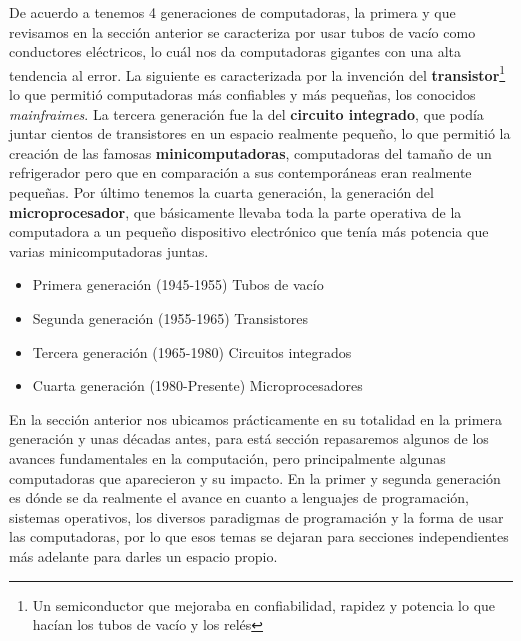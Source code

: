 \documentclass[letterpaper,12pt,oneside]{book}
\begin{document}
		De acuerdo a \cite{tanenbaum_modern_2002} tenemos 4 generaciones de computadoras, la primera y que revisamos en la sección anterior se caracteriza
		por usar tubos de vacío como conductores eléctricos, lo cuál nos da computadoras gigantes con una alta tendencia al error. La siguiente es caracterizada
		por la invención del \textbf{transistor}\footnote{Un semiconductor que mejoraba en confiabilidad, rapidez y potencia lo que hacían los tubos de vacío y los relés} lo que permitió computadoras más confiables y más pequeñas, los conocidos \textit{mainfraimes}. La
		tercera generación fue la del \textbf{circuito integrado}, que podía juntar cientos de transistores en un espacio realmente pequeño, lo que permitió
		la creación de las famosas \textbf{minicomputadoras}, computadoras del tamaño de un refrigerador pero que en comparación a sus contemporáneas eran realmente
		pequeñas. Por último tenemos la cuarta generación, la generación del \textbf{microprocesador}, que básicamente llevaba toda la parte operativa de la computadora
		a un pequeño dispositivo electrónico que tenía más potencia que varias minicomputadoras juntas.
		
		\begin{itemize}
			\item Primera generación (1945-1955) Tubos de vacío
			\item Segunda generación (1955-1965) Transistores
			\item Tercera generación (1965-1980) Circuitos integrados
			\item Cuarta generación (1980-Presente) Microprocesadores
		\end{itemize}
		
		En la sección anterior nos ubicamos prácticamente en su totalidad en la primera generación y unas décadas antes, para está sección repasaremos algunos
		de los avances fundamentales en la computación, pero principalmente algunas computadoras que aparecieron y su impacto. En la primer y segunda generación es dónde
		se da realmente el avance en cuanto a lenguajes de programación, sistemas operativos, los diversos paradigmas de programación y la
		forma de usar las computadoras,
		por lo que esos temas se dejaran para secciones independientes más adelante para darles un espacio propio.
		
		
\end{document}
